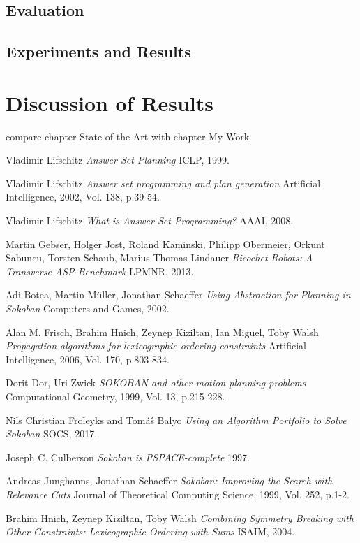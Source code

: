\documentclass{report}
\begin{document}
\section{Evaluation}
\section{Experiments and Results}
\chapter{Discussion of Results}
compare chapter State of the Art with chapter My Work \cite{LifschitzASP}

\begin{thebibliography}{}
Vladimir Lifschitz
\textit{Answer Set Planning}
ICLP, 1999.

Vladimir Lifschitz
\textit{Answer set programming and plan generation}
Artificial Intelligence, 2002, Vol. 138, p.39-54.

Vladimir Lifschitz
\textit{What is Answer Set Programming?}
AAAI, 2008.

Martin Gebser, Holger Jost, Roland Kaminski, Philipp Obermeier, Orkunt Sabuncu, Torsten Schaub, Marius Thomas Lindauer
\textit{Ricochet Robots: A Transverse ASP Benchmark}
LPMNR, 2013.

Adi Botea, Martin Müller, Jonathan Schaeffer
\textit{Using Abstraction for Planning in Sokoban}
Computers and Games, 2002.

Alan M. Frisch, Brahim Hnich, Zeynep Kiziltan, Ian Miguel, Toby Walsh
\textit{Propagation algorithms for lexicographic ordering constraints}
Artificial Intelligence, 2006, Vol. 170, p.803-834.

Dorit Dor, Uri Zwick
\textit{SOKOBAN and other motion planning problems}
Computational Geometry, 1999, Vol. 13, p.215-228.

Nils Christian Froleyks and Tom{\'a}{\^s} Balyo
\textit{Using an Algorithm Portfolio to Solve Sokoban}
SOCS, 2017.

Joseph C. Culberson
\textit{Sokoban is PSPACE-complete}
1997.

Andreas Junghanns, Jonathan Schaeffer
\textit{Sokoban: Improving the Search with Relevance Cuts}
Journal of Theoretical Computing Science, 1999, Vol. 252, p.1-2.

Brahim Hnich, Zeynep Kiziltan, Toby Walsh
\textit{Combining Symmetry Breaking with Other Constraints: Lexicographic Ordering with Sums}
ISAIM, 2004.
\end{thebibliography}
\end{document}
